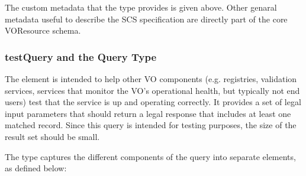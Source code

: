 \documentclass[11pt,a4paper]{ivoa}
\begin{document}

The custom metadata that the  type provides is given 
above. Other genaral metadata useful to describe the SCS 
specification are directly part of the core VOResource schema.

\subsubsection{testQuery and the Query Type}

The  element is intended to help other VO components (e.g.
registries, validation services, services that monitor the VO's
operational health, but typically not end users) test that the service
is up and operating correctly. It provides a set of legal input
parameters that should return a legal response that includes at least
one matched record. Since this query is intended for testing purposes,
the size of the result set should be small.

The  type captures the different components of the query into
separate elements, as defined below:
\end{document}
